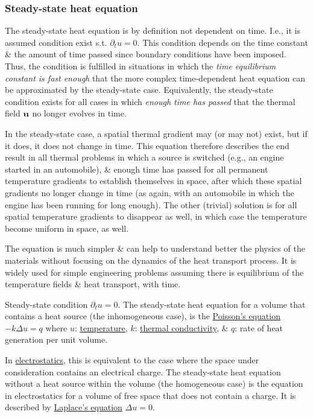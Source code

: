 \documentclass{article}
\begin{document}
\subsubsection{Steady-state heat equation}
The steady-state heat equation is by definition not dependent on time. I.e., it is assumed condition exist s.t. $\partial_tu = 0$. This condition depends on the time constant \& the amount of time passed since boundary conditions have been imposed. Thus, the condition is fulfilled in situations in which the {\it time equilibrium constant is fast enough} that the more complex time-dependent heat equation can be approximated by the steady-state case. Equivalently, the steady-state condition exists for all cases in which {\it enough time has passed} that the thermal field ${\bf u}$ no longer evolves in time.

In the steady-state case, a spatial thermal gradient may (or may not) exist, but if it does, it does not change in time. This equation therefore describes the end result in all thermal problems in which a source is switched (e.g., an engine started in an automobile), \& enough time has passed for all permanent temperature gradients to establish themselves in space, after which these spatial gradients no longer change in time (as again, with an automobile in which the engine has been running for long enough). The other (trivial) solution is for all spatial temperature gradients to disappear as well, in which case the temperature become uniform in space, as well.

The equation is much simpler \& can help to understand better the physics of the materials without focusing on the dynamics of the heat transport process. It is widely used for simple engineering problems assuming there is equilibrium of the temperature fields \& heat transport, with time.

Steady-state condition $\partial_tu = 0$. The steady-state heat equation for a volume that contains a heat source (the inhomogeneous case), is the \href{https://en.wikipedia.org/wiki/Poisson%27s_equation}{Poisson's equation} $-k\Delta u = q$ where $u$: \href{https://en.wikipedia.org/wiki/Thermodynamic_temperature}{temperature}, $k$: \href{https://en.wikipedia.org/wiki/Thermal_conductivity}{thermal conductivity}, \& $q$: rate of heat generation per unit volume.

In \href{https://en.wikipedia.org/wiki/Electrostatics}{electrostatics}, this is equivalent to the case where the space under consideration contains an electrical charge. The steady-state heat equation without a heat source within the volume (the homogeneous case) is the equation in electrostatics for a volume of free space that does not contain a charge. It is described by \href{https://en.wikipedia.org/wiki/Laplace%27s_equation}{Laplace's equation} $\Delta u = 0$.
\end{document}
